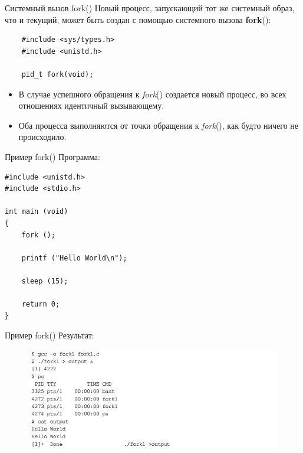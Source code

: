 \documentclass[xcolor=table]{beamer}
\begin{document}
\begin{frame}[fragile]{Системный вызов fork()}
	Новый процесс, запускающий тот же системный образ, что и текущий, может быть создан с помощью системного вызова \textbf{fork}():
	\begin{verbatim}
	#include <sys/types.h>
	#include <unistd.h>	
	
	pid_t fork(void);
	\end{verbatim}
	\begin{itemize}
		\item В случае успешного обращения к \textit{fork}() создается новый процесс, во всех отношениях идентичный вызывающему. 
		\item Оба процесса выполняются от точки обращения к \textit{fork}(), как будто ничего не происходило.
	\end{itemize}
\end{frame}

\begin{frame}[fragile]{Пример fork()}
Программа:
	\begin{verbatim}
#include <unistd.h>
#include <stdio.h>

int main (void)
{
    fork ();

    printf ("Hello World\n");

    sleep (15);
    
    return 0;
}
	\end{verbatim}
\end{frame}

\begin{frame}{Пример fork()}
	Результат:
	\begin{figure}[h]
		\centering
		\includegraphics[scale=0.75]{images/lec07-pic32.png}
	\end{figure}
\end{frame}
\end{document}
